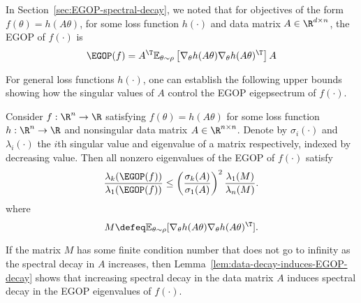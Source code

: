 In Section~\ref{sec:EGOP-spectral-decay}, we noted that for objectives of the form $f(\theta) = h(A\theta)$, for some loss function $h(\cdot)$ and data matrix $A \in \R^{d\times n}$, the EGOP of $f(\cdot)$ is
    \begin{equation}\label{eq:EGOP-chain-rule}
        \EGOP(f) = A^\T \mathbb{E}_{\theta\sim \rho}\left[\nabla_\theta h(A\theta) \nabla_\theta h(A\theta)^\T\right] A
    \end{equation}

For general loss functions $h(\cdot)$, one can establish the following upper bounds showing how the singular values of $A$ control the EGOP eigepsectrum of $f(\cdot)$.    
    \begin{lemma}\label{lem:data-decay-induces-EGOP-decay}
        Consider $f:\R^n\rightarrow \R$ satisfying $f(\theta) = h(A\theta)$ for some loss function $h:\R^n\rightarrow \R$ and nonsingular data matrix $A \in \R^{n\times n}$. Denote by  $\sigma_i(\cdot)$ and $\lambda_i(\cdot)$ the $i$th singular value and eigenvalue of a matrix respectively, indexed by decreasing value. Then all nonzero eigenvalues of the EGOP of $f(\cdot)$ satisfy
        \[
            \frac{\lambda_k(\EGOP(f))}{ \lambda_1(\EGOP(f))} \leq \left(\frac{\sigma_k(A)}{\sigma_1(A)}\right)^2\frac{\lambda_1(M)}{\lambda_n(M)}.
        \]
        where
        \[
            M\defeq \mathbb{E}_{\theta\sim\rho}[\nabla_\theta h(A\theta) \nabla_\theta h(A\theta)^\T].
        \]
    \end{lemma}
    If the matrix $M$ has some finite condition number that does not go to infinity as the spectral decay in $A$ increases, then Lemma~\ref{lem:data-decay-induces-EGOP-decay} shows that increasing spectral decay in the data matrix $A$ induces spectral decay in the EGOP eigenvalues of $f(\cdot)$.

